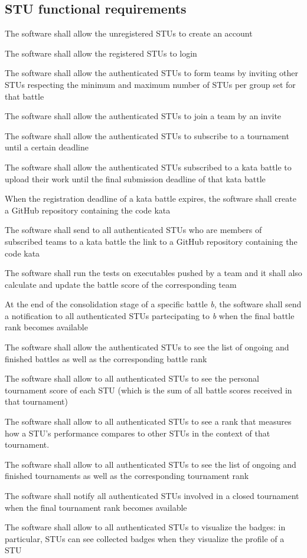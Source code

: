 \subsection*{STU functional requirements}
\begin{requirementsenumerate}[resume]
    \item The software shall allow the unregistered STUs to create an account
    \item The software shall allow the registered STUs to login
    \item The software shall allow the authenticated STUs to form teams by inviting other STUs respecting the minimum and maximum number of STUs per group set for that battle
    \item The software shall allow the authenticated STUs to join a team by an invite
    \item The software shall allow the authenticated STUs to subscribe to a tournament until a certain deadline
    \item The software shall allow the authenticated STUs subscribed to a kata battle to upload their work until the final submission deadline of that kata battle
    \item When the registration deadline of a kata battle expires, the software shall create a GitHub repository containing the code kata
    \item The software shall send to all authenticated STUs who are members of subscribed teams to a kata battle the link to a GitHub repository containing the code kata
    \item The software shall run the tests on executables pushed by a team and it shall also calculate and update the battle score of the corresponding team
    \item At the end of the consolidation stage of a specific battle \textit{b}, the software shall send a notification to all authenticated STUs partecipating to \textit{b} when the final battle rank becomes available
    \item The software shall allow the authenticated STUs to see the list of ongoing and finished battles as well as the corresponding battle rank
    \item The software shall allow to all authenticated STUs to see the personal tournament score of each STU (which is the sum of all battle scores received in that tournament)
    \item The software shall allow to all authenticated STUs to see a rank that measures how a STU's performance compares to other STUs in the context of that tournament.
    \item The software shall allow to all authenticated STUs to see the list of ongoing and finished tournaments as well as the corresponding tournament rank
    \item The software shall notify all authenticated STUs involved in a closed tournament when the final tournament rank becomes available
    \item The software shall allow to all authenticated STUs to visualize the badges: in particular, STUs can see collected badges when they visualize the profile of a STU
\end{requirementsenumerate}


